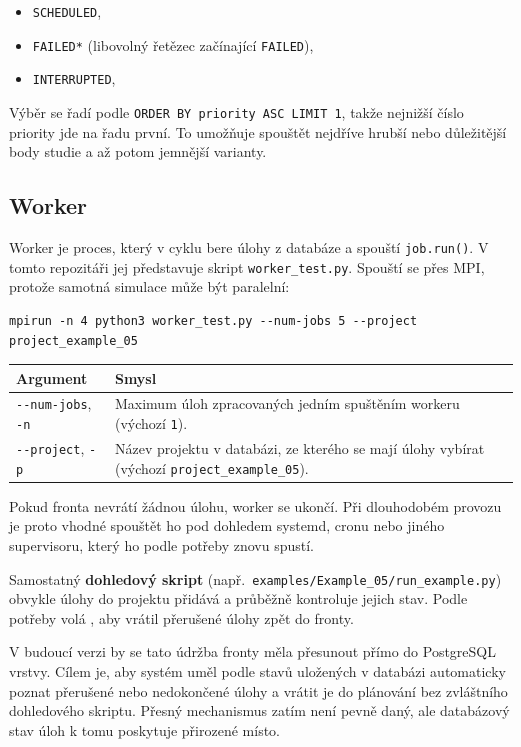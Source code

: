 \documentclass[a4paper,11pt]{article}
\begin{document}
\begin{itemize}
  \item \texttt{SCHEDULED},
  \item \texttt{FAILED*} (libovolný řetězec začínající \texttt{FAILED}),
  \item \texttt{INTERRUPTED},
\end{itemize}

Výběr se řadí podle \texttt{ORDER BY priority ASC LIMIT 1}, takže nejnižší číslo
priority jde na řadu první. To umožňuje spouštět nejdříve hrubší nebo důležitější
body studie a až potom jemnější varianty.

\subsection*{Worker}

Worker je proces, který v cyklu bere úlohy z databáze a spouští
\texttt{job.run()}. V tomto repozitáři jej představuje skript
\texttt{worker\_test.py}. Spouští se přes MPI, protože samotná simulace může být
paralelní:

\begin{lstlisting}[style=bash]
mpirun -n 4 python3 worker_test.py --num-jobs 5 --project project_example_05
\end{lstlisting}

\begin{longtable}{@{}L{4.5cm} L{10.5cm}@{}}
\toprule
\textbf{Argument} & \textbf{Smysl} \\
\midrule
\endhead
\texttt{-{}-num-jobs}, \texttt{-n}
  & Maximum úloh zpracovaných jedním spuštěním workeru (výchozí \texttt{1}). \\
\texttt{-{}-project}, \texttt{-p}
  & Název projektu v databázi, ze kterého se mají úlohy vybírat
    (výchozí \texttt{project\_example\_05}). \\
\bottomrule
\end{longtable}

Pokud fronta nevrátí žádnou úlohu, worker se ukončí. Při dlouhodobém provozu je
proto vhodné spouštět ho pod dohledem systemd, cronu nebo jiného supervisoru,
který ho podle potřeby znovu spustí.

Samostatný \textbf{dohledový skript} (např.\
\texttt{examples/Example\_05/run\_example.py}) obvykle úlohy do projektu přidává
a průběžně kontroluje jejich stav. Podle potřeby volá
, aby vrátil přerušené úlohy zpět do fronty.

\begin{noteblock}
V budoucí verzi by se tato údržba fronty měla přesunout přímo do PostgreSQL
vrstvy. Cílem je, aby systém uměl podle stavů uložených v databázi automaticky
poznat přerušené nebo nedokončené úlohy a vrátit je do plánování bez zvláštního
dohledového skriptu. Přesný mechanismus zatím není pevně daný, ale databázový
stav úloh k tomu poskytuje přirozené místo.
\end{noteblock}
\end{document}
